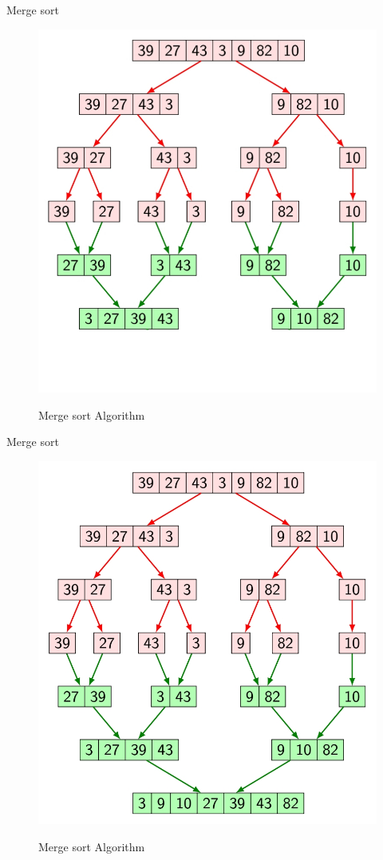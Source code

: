 \documentclass{beamer}
\begin{document}
\begin{frame}{Merge sort}
	\begin{figure}[h]
		\centering
		\includegraphics[scale=0.24]{IKEHS14.jpg}
		\label{fig:2}
		\caption{Merge sort Algorithm}
	\end{figure}
\end{frame}

\begin{frame}{Merge sort}
	\begin{figure}[h]
		\centering
		\includegraphics[scale=0.24]{IKEHS15.jpg}
		\label{fig:2}
		\caption{Merge sort Algorithm}
	\end{figure}
\end{frame}
\end{document}
